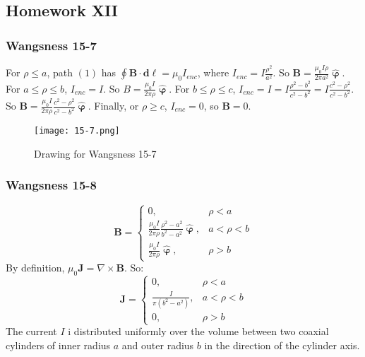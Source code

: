         \subsection{Homework XII}
            \subsubsection{Wangsness 15-7}
            For $\rho\leq a$, path $(1)$ has $\oint \mathbf{B}\cdot \mathbf{d\ell}= \mu_0 I_{enc}$, where $I_{enc} = I\frac{\rho^2}{a^2}$. So $\mathbf{B} = \frac{\mu_0 I\rho}{2\pi a^2} \hat{\boldsymbol{\upvarphi}}$. For $a\leq \rho \leq b$, $I_{enc} = I$. So $B = \frac{\mu_0 I}{2\pi \rho} \hat{\boldsymbol{\upvarphi}}$. For $b\leq \rho \leq c$, $I_{enc} = I =I\frac{\rho^2-b^2}{c^2-b^2} = I\frac{c^2-\rho^2}{c^2-b^2}$. So $\mathbf{B} = \frac{\mu_0 I}{2\pi \rho} \frac{c^2-\rho^2}{c^2-b^2}\hat{\boldsymbol{\upvarphi}}$. Finally, or $\rho \geq c$, $I_{enc} = 0$, so $\mathbf{B} = 0$.
            \begin{figure}[htbp]
                \centering
                \captionsetup{type=figure}
                \texttt{[image: 15-7.png]}
                \caption{Drawing for Wangsness 15-7}
            \end{figure}
            \subsubsection{Wangsness 15-8}
            \begin{equation*}
                \mathbf{B}=
                    \begin{cases}
                        0,&\rho<a\\
                        \frac{\mu_0 I}{2\pi \rho}
                        \frac{\rho^2-a^2}{b^2-a^2}
                        \hat{\boldsymbol{\upvarphi}},
                        &a<\rho<b\\
                        \frac{\mu_0 I}{2\pi \rho} \hat{\boldsymbol{\upvarphi}},
                        &\rho>b
                    \end{cases}    
            \end{equation*}
            By definition, $\mu_0 \mathbf{J} = \nabla \times \mathbf{B}$. So:
            \begin{equation*}
                \mathbf{J} = \begin{cases} 0, & \rho<a\\ \frac{I}{\pi(b^2-a^2)}, & a<\rho < b\\ 0, & \rho>b \end{cases}    
            \end{equation*}
            The current $I$ i distributed uniformly over the volume between two coaxial cylinders of inner radius $a$ and outer radius $b$ in the direction of the cylinder axis.
